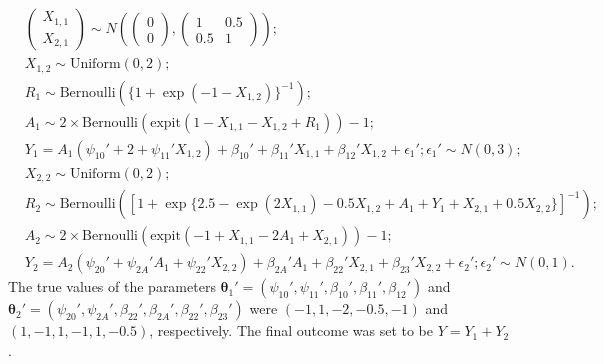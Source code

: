 \documentclass[12pt]{article}
\begin{document}
\begin{align*}
    & \left( \begin{matrix}X_{1,1}\\X_{2,1}\end{matrix}\right)  \sim N\left(\left( \begin{matrix}0\\0\end{matrix}\right), \left(  \begin{matrix}1 & 0.5\\0.5 & 1 \end{matrix}\right) \right) ;\\
    & X_{1,2} \sim \text{Uniform}(0,2); \\
    &R_1  \sim \text{Bernoulli} (\{1+\exp(-1-X_{1,2})\}^{-1});\\
    & A_1  \sim 2\times \text{Bernoulli}(\text{expit}(1-X_{1,1}-X_{1,2}+R_1)) - 1;\\
    & Y_1  =  A_1(\psi_{10}'+2+\psi_{11}'X_{1,2})+\beta_{10}'+\beta_{11}' X_{1,1} + \beta_{12}' X_{1,2} + \epsilon_1' ; \epsilon_1' \sim N(0,3);\\
    & X_{2,2} \sim \text{Uniform}(0,2); \\
    &R_2 \sim  \text{Bernoulli} ([1+\exp\{2.5-\exp(2X_{1,1})-0.5X_{1,2}+A_1+Y_{1}+X_{2,1}+0.5X_{2,2}\}]^{-1}) ; \\
    & A_2\sim 2\times \text{Bernoulli} (\text{expit}(-1+X_{1,1}-2A_1+X_{2,1}) ) - 1;\\
    & Y_2 = A_2(\psi_{20}'+\psi_{2A}'A_1+\psi_{22}'X_{2,2}) + \beta_{2A}'A_1 + \beta_{22}'X_{2,1}+ \beta_{23}'X_{2,2} + \epsilon_2'; \epsilon_2' \sim N(0,1). 
\end{align*}
The true values of the parameters $\bm{\theta}_1' = (\psi_{10}',\psi_{11}',\beta_{10}',\beta_{11}',\beta_{12}')$ and $\bm{\theta}_2' = (\psi_{20}',\psi_{2A}',\beta_{22}',\beta_{2A}',\beta_{22}',\beta_{23}')$ were $(-1,1,-2,-0.5,-1)$ and $(1,-1,1,-1,1,-0.5)$, respectively. The final outcome was set to be $Y=Y_1+Y_2$. 

\end{document}
